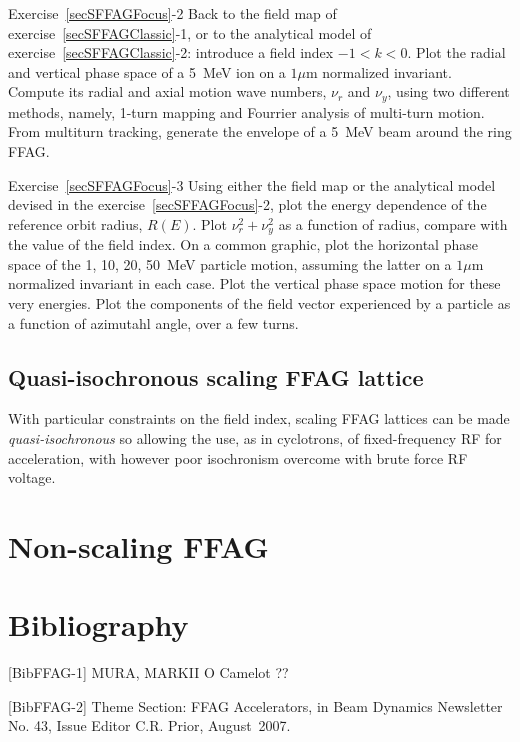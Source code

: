\smallskip
\noindent {\small $\bullet$} Exercise~\ref{secSFFAGFocus}-2
Back to the field map of exercise~\ref{secSFFAGClassic}-1, or to the analytical model 
of exercise~\ref{secSFFAGClassic}-2: introduce a field index $-1<k<0$. 
Plot the radial and vertical phase space of a 5~MeV ion on a $1\mu$m normalized invariant.  
Compute its radial and axial motion wave numbers, $\nu_r$ and $\nu_y$, 
using two different methods, namely, 1-turn mapping and  Fourrier analysis of multi-turn motion. 
From multiturn tracking, generate the envelope of a 5~MeV beam around the ring FFAG.  


\smallskip
\noindent {\small $\bullet$} Exercise~\ref{secSFFAGFocus}-3
Using either the field map or the analytical model devised in the  exercise~\ref{secSFFAGFocus}-2, 
 plot the energy dependence of the reference orbit radius, $R(E)$. 
Plot  $\nu_r^2 + \nu_y^2$ as a function of radius, compare with the value of the field index. 
On a common graphic, plot the horizontal phase space of the 1, 10, 20, 50~MeV particle motion,
assuming the latter on a $1\mu$m normalized invariant in each case.
Plot the vertical phase space motion for these very energies. 
Plot the components of the field vector experienced by a particle as a function of 
azimutahl angle, over a few turns.


\subsection{Quasi-isochronous scaling FFAG lattice \label{SecSFFAGQuasiIsoCrhro}}

With particular constraints on the field index, 
scaling FFAG lattices can be made \textsl{quasi-isochronous} so allowing the use, as in cyclotrons, of fixed-frequency RF 
for acceleration, with however poor isochronism overcome with brute force RF voltage. 




\section{Non-scaling FFAG \label{secNSFFAG}}



\section{Bibliography}

[BibFFAG-1] MURA, MARKII
O Camelot ??


[BibFFAG-2]
Theme Section: FFAG Accelerators, 
in 
Beam Dynamics Newsletter No. 43, 
Issue Editor C.R. Prior, 
August~2007.



